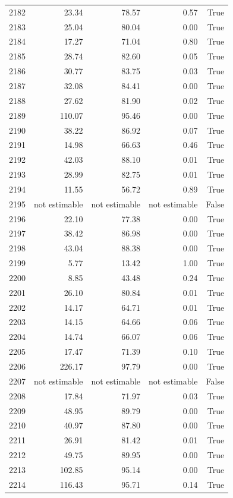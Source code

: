 \begin{longtable}{rrrrr}
2182 & 23.34 & 78.57 & 0.57 & True \\
2183 & 25.04 & 80.04 & 0.00 & True \\
2184 & 17.27 & 71.04 & 0.80 & True \\
2185 & 28.74 & 82.60 & 0.05 & True \\
2186 & 30.77 & 83.75 & 0.03 & True \\
2187 & 32.08 & 84.41 & 0.00 & True \\
2188 & 27.62 & 81.90 & 0.02 & True \\
2189 & 110.07 & 95.46 & 0.00 & True \\
2190 & 38.22 & 86.92 & 0.07 & True \\
2191 & 14.98 & 66.63 & 0.46 & True \\
2192 & 42.03 & 88.10 & 0.01 & True \\
2193 & 28.99 & 82.75 & 0.01 & True \\
2194 & 11.55 & 56.72 & 0.89 & True \\
2195 & not estimable & not estimable & not estimable & False \\
2196 & 22.10 & 77.38 & 0.00 & True \\
2197 & 38.42 & 86.98 & 0.00 & True \\
2198 & 43.04 & 88.38 & 0.00 & True \\
2199 & 5.77 & 13.42 & 1.00 & True \\
2200 & 8.85 & 43.48 & 0.24 & True \\
2201 & 26.10 & 80.84 & 0.01 & True \\
2202 & 14.17 & 64.71 & 0.01 & True \\
2203 & 14.15 & 64.66 & 0.06 & True \\
2204 & 14.74 & 66.07 & 0.06 & True \\
2205 & 17.47 & 71.39 & 0.10 & True \\
2206 & 226.17 & 97.79 & 0.00 & True \\
2207 & not estimable & not estimable & not estimable & False \\
2208 & 17.84 & 71.97 & 0.03 & True \\
2209 & 48.95 & 89.79 & 0.00 & True \\
2210 & 40.97 & 87.80 & 0.00 & True \\
2211 & 26.91 & 81.42 & 0.01 & True \\
2212 & 49.75 & 89.95 & 0.00 & True \\
2213 & 102.85 & 95.14 & 0.00 & True \\
2214 & 116.43 & 95.71 & 0.14 & True \\

\end{longtable}
